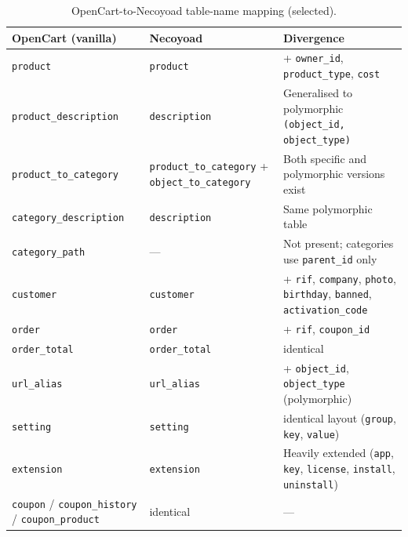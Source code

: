 \documentclass[11pt,a4paper]{article}
\begin{document}
\begin{table}[htbp]
\centering
\caption{OpenCart-to-Necoyoad table-name mapping (selected).}\label{tab:opencart-mapping}
\footnotesize\sloppy
\begin{tabularx}{\columnwidth}{>{\raggedright\arraybackslash}p{3.6cm}>{\raggedright\arraybackslash}p{3.6cm}X}
\toprule
\textbf{OpenCart (vanilla)} & \textbf{Necoyoad} & \textbf{Divergence} \\
\midrule
\texttt{product}                       & \texttt{product}                       & + \texttt{owner\_id}, \texttt{product\_type}, \texttt{cost} \\
\texttt{product\_description}          & \texttt{description}                   & Generalised to polymorphic \texttt{(object\_id, object\_type)} \\
\texttt{product\_to\_category}         & \texttt{product\_to\_category} + \texttt{object\_to\_category} & Both specific and polymorphic versions exist \\
\texttt{category\_description}         & \texttt{description}                   & Same polymorphic table \\
\texttt{category\_path}                & ---                                    & Not present; categories use \texttt{parent\_id} only \\
\texttt{customer}                      & \texttt{customer}                      & + \texttt{rif}, \texttt{company}, \texttt{photo}, \texttt{birthday}, \texttt{banned}, \texttt{activation\_code} \\
\texttt{order}                         & \texttt{order}                         & + \texttt{rif}, \texttt{coupon\_id} \\
\texttt{order\_total}                  & \texttt{order\_total}                  & identical \\
\texttt{url\_alias}                    & \texttt{url\_alias}                    & + \texttt{object\_id}, \texttt{object\_type} (polymorphic) \\
\texttt{setting}                       & \texttt{setting}                       & identical layout (\texttt{group}, \texttt{key}, \texttt{value}) \\
\texttt{extension}                     & \texttt{extension}                     & Heavily extended (\texttt{app}, \texttt{key}, \texttt{license}, \texttt{install}, \texttt{uninstall}) \\
\texttt{coupon} / \texttt{coupon\_history} / \texttt{coupon\_product} & identical & --- \\
\bottomrule
\end{tabularx}
\end{table}
\end{document}
